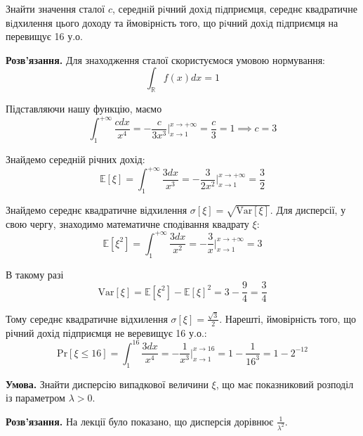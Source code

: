 \documentclass[oneside,solution]{karazin-prob-theory-assign}
\begin{document}
Знайти значення сталої $c$, середнiй рiчний дохiд пiдприємця, середнє квадратичне вiдхилення цього доходу та ймовiрнiсть того, що рiчний дохiд пiдприємця на перевищує 16 у.о.

\textbf{Розв'язання.} Для знаходження сталої скористуємося умовою нормування:
\begin{equation}
    \int_{\mathbb{R}}f(x)dx = 1
\end{equation}

Підставляючи нашу функцію, маємо
\begin{equation}
    \int_{1}^{+\infty} \frac{cdx}{x^4} = -\frac{c}{3x^3} \Big|_{x \to 1}^{x \to +\infty} = \frac{c}{3} = 1 \implies c = 3
\end{equation}

Знайдемо середній річних дохід:
\begin{equation}
    \mathbb{E}[\xi] = \int_{1}^{+\infty} \frac{3dx}{x^3} = -\frac{3}{2x^2}\Big|_{x \to 1}^{x \to +\infty} = \frac{3}{2}
\end{equation}

Знайдемо середнє квадратичне відхилення $\sigma[\xi] = \sqrt{\text{Var}[\xi]}$. Для дисперсії, у свою чергу, знаходимо математичне сподівання квадрату $\xi$:
\begin{equation}
    \mathbb{E}[\xi^2] = \int_1^{+\infty} \frac{3dx}{x^2} = -\frac{3}{x}\Big|_{x \to 1}^{x \to +\infty} = 3
\end{equation}

В такому разі
\begin{equation}
    \text{Var}[\xi] = \mathbb{E}[\xi^2] - \mathbb{E}[\xi]^2 = 3 - \frac{9}{4} = \frac{3}{4}
\end{equation}

Тому середнє квадратичне відхилення $\sigma[\xi] = \frac{\sqrt{3}}{2}$. Нарешті, ймовірність того, що річний дохід підприємця не веревищує 16 у.о.:
\begin{equation}
    \text{Pr}[\xi \leq 16] = \int_1^{16} \frac{3dx}{x^4} = -\frac{1}{x^3}\Big|_{x \to 1}^{x \to 16} = 1 - \frac{1}{16^3} = 1 - 2^{-12}
\end{equation}


\hspace{20px}\textbf{Умова.} Знайти дисперсію випадкової величини $\xi$, що має показниковий розподіл із параметром $\lambda>0$.

\textbf{Розв'язання.} На лекції було показано, що дисперсія дорівнює $\frac{1}{\lambda^2}$.
\end{document}
